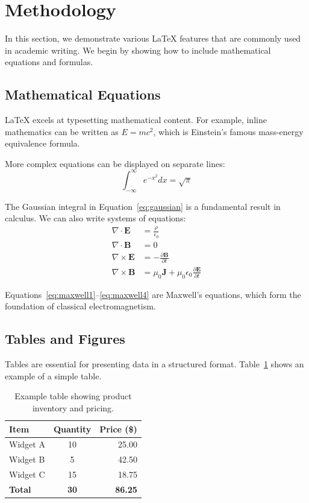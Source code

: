\documentclass[12pt,a4paper]{article}
\begin{document}
\section{Methodology}
\label{sec:methodology}

In this section, we demonstrate various LaTeX features that are commonly used in academic writing. We begin by showing how to include mathematical equations and formulas.

\subsection{Mathematical Equations}
\label{subsec:equations}

LaTeX excels at typesetting mathematical content. For example, inline mathematics can be written as $E = mc^2$, which is Einstein's famous mass-energy equivalence formula.

More complex equations can be displayed on separate lines:
\begin{equation}
    \int_{-\infty}^{\infty} e^{-x^2} dx = \sqrt{\pi}
    \label{eq:gaussian}
\end{equation}

The Gaussian integral in Equation~\ref{eq:gaussian} is a fundamental result in calculus. We can also write systems of equations:
\begin{align}
    \nabla \cdot \mathbf{E} &= \frac{\rho}{\epsilon_0} \label{eq:maxwell1}\\
    \nabla \cdot \mathbf{B} &= 0 \label{eq:maxwell2}\\
    \nabla \times \mathbf{E} &= -\frac{\partial \mathbf{B}}{\partial t} \label{eq:maxwell3}\\
    \nabla \times \mathbf{B} &= \mu_0\mathbf{J} + \mu_0\epsilon_0\frac{\partial \mathbf{E}}{\partial t} \label{eq:maxwell4}
\end{align}

Equations~\ref{eq:maxwell1}--\ref{eq:maxwell4} are Maxwell's equations, which form the foundation of classical electromagnetism.

\subsection{Tables and Figures}
\label{subsec:tables}

Tables are essential for presenting data in a structured format. Table~\ref{tab:example} shows an example of a simple table.

\begin{table}[h]
\centering
\begin{tabular}{|l|c|r|}
\hline
\textbf{Item} & \textbf{Quantity} & \textbf{Price (\$)} \\
\hline
Widget A & 10 & 25.00 \\
Widget B & 5 & 42.50 \\
Widget C & 15 & 18.75 \\
\hline
\textbf{Total} & \textbf{30} & \textbf{86.25} \\
\hline
\end{tabular}
\caption{Example table showing product inventory and pricing.}
\label{tab:example}
\end{table}
\end{document}

